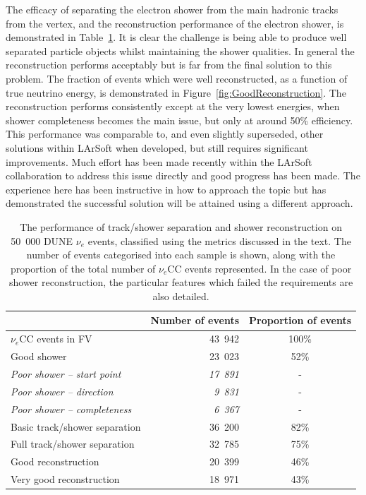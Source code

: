 The efficacy of separating the electron shower from the main hadronic tracks from the vertex, and the reconstruction performance of the electron shower, is demonstrated in Table~\ref{tab:GoodReconstruction}.  It is clear the challenge is being able to produce well separated particle objects whilst maintaining the shower qualities.  In general the reconstruction performs acceptably but is far from the final solution to this problem.  The fraction of events which were well reconstructed, as a function of true neutrino energy, is demonstrated in Figure~\ref{fig:GoodReconstruction}.  The reconstruction performs consistently except at the very lowest energies, when shower completeness becomes the main issue, but only at around 50\% efficiency.  This performance was comparable to, and even slightly superseded, other solutions within LArSoft when developed, but still requires significant improvements.  Much effort has been made recently within the LArSoft collaboration to address this issue directly and good progress has been made.  The experience here has been instructive in how to approach the topic but has demonstrated the successful solution will be attained using a different approach.

\begin{table}
  \centering
  \caption[The performance of track/shower separation and shower reconstruction on 50~000 DUNE $\nu_e$ events.]{The performance of track/shower separation and shower reconstruction on 50~000 DUNE $\nu_e$ events, classified using the metrics discussed in the text.  The number of events categorised into each sample is shown, along with the proportion of the total number of $\nu_e$CC events represented.  In the case of poor shower reconstruction, the particular features which failed the requirements are also detailed.}
  \label{tab:GoodReconstruction}
  \begin{tabular}{l r c}
    \toprule
      & Number of events & Proportion of events \\
    \midrule
    $\nu_e$CC events in FV               & 43~942 & 100\% \\
    Good shower                          & 23~023 & 52\%  \\
    \textit{Poor shower -- start point}  & \textit{17~891} & -     \\
    \textit{Poor shower -- direction}    & \textit{9~831}  & -     \\
    \textit{Poor shower -- completeness} & \textit{6~367}  & -     \\
    Basic track/shower separation        & 36~200 & 82\%  \\
    Full track/shower separation         & 32~785 & 75\%  \\
    Good reconstruction                  & 20~399 & 46\%  \\
    Very good reconstruction             & 18~971 & 43\%  \\
    \bottomrule
  \end{tabular}
\end{table}

